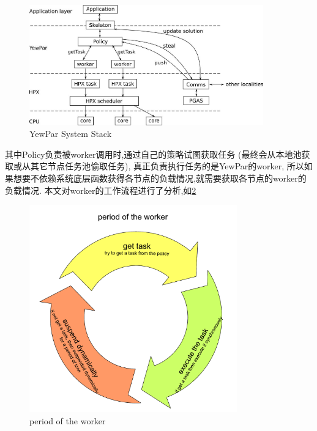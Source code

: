 \documentclass{mproj}
\begin{document}
\begin{figure}[h] %
    \centering %
    \includegraphics[width=0.9\textwidth]{images/YewPar_System_Stack.jpg} %
    \caption{YewPar System Stack} %
    \label{fig:yewpar_system_stack} %
\end{figure}
\FloatBarrier

其中Policy负责被worker调用时,通过自己的策略试图获取任务
(最终会从本地池获取或从其它节点任务池偷取任务),
真正负责执行任务的是YewPar的worker,
所以如果想要不依赖系统底层函数获得各节点的负载情况,就需要获取各节点的worker的负载情况.
本文对worker的工作流程进行了分析,如\cref{fig:period_of_worker}

\begin{figure}[h]
    \centering %
    \includegraphics[width=0.8\textwidth]{images/period_of_worker.pdf} %
    \caption{period of the worker} %
    \label{fig:period_of_worker} %
\end{figure}
\FloatBarrier
\end{document}
